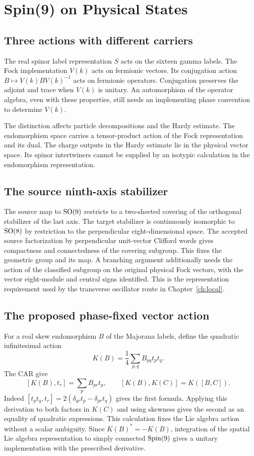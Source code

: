 \chapter{Spin(9) on Physical States}\label{ch:spin}

\section{Three actions with different carriers}
The real spinor label representation $S$ acts on the sixteen gamma labels. The Fock implementation $V(k)$ acts on fermionic vectors. Its conjugation action $B\mapsto V(k)BV(k)^{-1}$ acts on fermionic operators. Conjugation preserves the adjoint and trace when $V(k)$ is unitary. An automorphism of the operator algebra, even with these properties, still needs an implementing phase convention to determine $V(k)$.

The distinction affects particle decompositions and the Hardy estimate. The endomorphism space carries a tensor-product action of the Fock representation and its dual. The charge outputs in the Hardy estimate lie in the physical vector space. Its spinor intertwiners cannot be supplied by an isotypic calculation in the endomorphism representation.

\section{The source ninth-axis stabilizer}
The source map to $\operatorname{SO}(9)$ restricts to a two-sheeted covering of the orthogonal stabilizer of the last axis. The target stabilizer is continuously isomorphic to $\operatorname{SO}(8)$ by restriction to the perpendicular eight-dimensional space. The accepted source factorization by perpendicular unit-vector Clifford words gives compactness and connectedness of the covering subgroup. This fixes the geometric group and its map. A branching argument additionally needs the action of the classified subgroup on the original physical Fock vectors, with the vector eight-module and central signs identified. This is the representation requirement used by the transverse oscillator route in Chapter~\ref{ch:local}.

\section{The proposed phase-fixed vector action}
For a real skew endomorphism $B$ of the Majorana labels, define the quadratic infinitesimal action
\[
 K(B)=\frac14\sum_{p,q}B_{pq}t_p t_q .
\]
The CAR give
\[
 [K(B),t_r]=\sum_p B_{pr}t_p,\qquad
 [K(B),K(C)]=K([B,C]).
\]
Indeed $[t_pt_q,t_r]=2(\delta_{qr}t_p-\delta_{pr}t_q)$ gives the first formula. Applying this derivation to both factors in $K(C)$ and using skewness gives the second as an equality of quadratic expressions. This calculation fixes the Lie algebra action without a scalar ambiguity. Since $K(B)^\ast=-K(B)$, integration of the spatial Lie algebra representation to simply connected $\operatorname{Spin}(9)$ gives a unitary implementation with the prescribed derivative.

